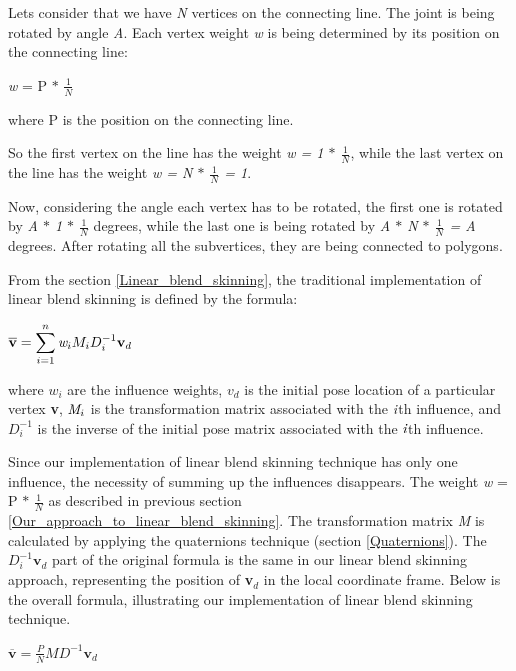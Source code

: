 \documentclass[times, 10pt,twocolumn]{article}
\begin{document}
Lets consider that we have \emph{N} vertices on the connecting line. The joint is being rotated by angle \emph{A}. Each vertex weight \emph{w} is being determined by its position on the connecting line:

\begin{center}
\emph{w} = P $\ast$ $\frac{1}{N}$
\end{center}
where P is the position on the connecting line.

So the first vertex on the line has the weight \emph{w = 1 $\ast$ $\frac{1}{N}$}, while the last vertex on the line has the weight \emph{w =  N $\ast$ $\frac{1}{N}$ = 1}.

Now, considering the angle each vertex has to be rotated, the first one is rotated by \emph{A $\ast$ 1 $\ast$ $\frac{1}{N}$} degrees, while the last one is being rotated by \emph{A $\ast$ N $\ast$  $\frac{1}{N}$ = A} degrees. After rotating all the subvertices, they are being connected to polygons.

\label{relation}

From the section \ref{Linear_blend_skinning}, the traditional implementation of linear blend skinning is defined by the formula:
\begin{center}
$ \overline{\textbf{v}} = \displaystyle\sum_{i=1}^n\emph{w}_{i}M_{i}D_{i}^{-1}\textbf{v}_{d} $
\end{center}
where $w_{i}$ are the influence weights, $v_{d}$ is the initial pose location of a
particular vertex \textbf{v}, $\emph{M}_{i}$ is the transformation matrix associated with
the $\emph{i}$th influence, and $D_{i}^{-1}$ is the inverse of the initial pose matrix
associated with the $\emph{i}$th influence.

Since our implementation of linear blend skinning technique has only one influence, the necessity of summing up the influences disappears. The weight \emph{w} = P $\ast$ $\frac{1}{N}$ as described in previous section \ref{Our_approach_to_linear_blend_skinning}. The transformation matrix \emph{M} is calculated by applying the quaternions technique (section \ref{Quaternions}). The $D_{i}^{-1}\textbf{v}_{d}$ part of the original formula is the same in our linear blend skinning approach, representing the position of \textbf{v$_{d}$} in the local coordinate frame. Below is the overall formula, illustrating our implementation of linear blend skinning technique.
\begin{center}
$ \overline{\textbf{v}} = \frac{P}{N}MD^{-1}\textbf{v}_{d} $
\end{center}
\end{document}
